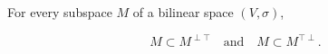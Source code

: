 For every subspace $M$ of a bilinear space $(V, \sigma)$,

$$M \subset M^{\perp \top} \quad \text{and} \quad M \subset M^{\top \perp}.$$
